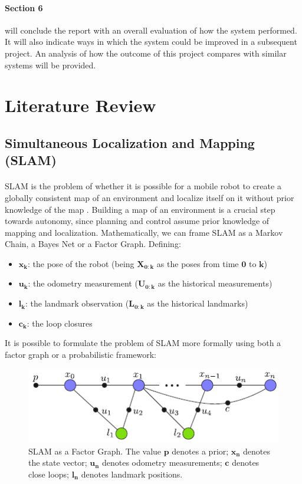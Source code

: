 \documentclass[12pt]{article}
\begin{document}
		\paragraph{Section 6} will conclude the report with an overall evaluation of how the system performed. It will also indicate ways in which the system could be improved in a subsequent project. An analysis of how the outcome of this project compares with similar systems will be provided.

	\newpage
	\section{Literature Review}
	\subsection{Simultaneous Localization and Mapping (SLAM)}
	\paragraph{}
	SLAM is the problem of whether it is possible for a mobile robot to create a globally consistent map of an environment and localize itself on it without prior knowledge of the map \cite{SLAMPartI}\cite{Cadena}. Building a map of an environment is a crucial step towards autonomy, since planning and control assume prior knowledge of mapping and localization. Mathematically, we can frame SLAM as a Markov Chain, a Bayes Net or a Factor Graph. Defining:
	
	\begin{itemize}
		\item $\mathbf{x_k}$: the pose of the robot (being $\mathbf{X_{0:k}}$ as the poses from time $\mathbf{0}$ to $\mathbf{k}$)
		\item $\mathbf{u_k}$: the odometry measurement ($\mathbf{U_{0:k}}$ as the historical measurements)
		\item $\mathbf{l_k}$: the landmark observation ($\mathbf{L_{0:k}}$ as the historical landmarks)
		\item $\mathbf{c_k}$: the loop closures
	\end{itemize}

	It is possible to formulate the problem of SLAM more formally using both a factor graph or a probabilistic framework:

	\begin{figure}[h]
		\centering
		\includegraphics{SLAMFactorGraph}
		\caption{SLAM as a Factor Graph. The value $\mathbf{p}$ denotes a prior; $\mathbf{x_n}$ denotes the state vector; $\mathbf{u_n}$ denotes odometry measurements; $\mathbf{c}$ denotes close loops; $\mathbf{l_n}$ denotes landmark positions.}
		\label{fig:slam1}
	\end{figure}
	
\end{document}
